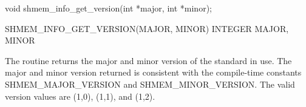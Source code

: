 \synC   %

void shmem_info_get_version(int *major, int *minor); %

\synF   %

SHMEM_INFO_GET_VERSION(MAJOR, MINOR)   
INTEGER MAJOR, MINOR %

{
  The routine returns the major and minor version of the \openshmem{} standard in use.
  The major and minor version returned is consistent with the compile-time
  constants
  \newline
  SHMEM\_MAJOR\_VERSION and SHMEM\_MINOR\_VERSION. 
  The valid version values are (1,0), (1,1), and (1,2).
}
{
}
\eAPI

